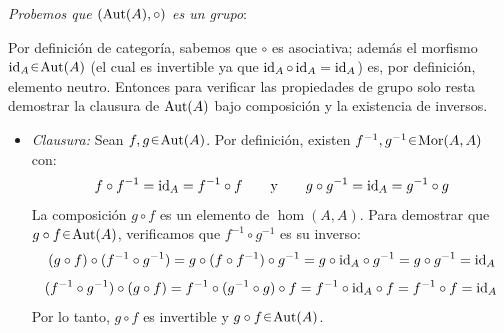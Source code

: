 \begin{sol}
\emph{Probemos que $(\operatorname{Aut}(A), \circ)$ es un grupo}:\par
Por definición de categoría, sabemos que $\circ$ es asociativa; además el morfismo $\id_A\en\aut(A)$ (el cual es invertible ya que $\operatorname{id}_A \circ \operatorname{id}_A = \operatorname{id}_A$) es, por definición, elemento neutro. Entonces para verificar las propiedades de grupo solo resta demostrar la clausura de $\operatorname{Aut}(A)$ bajo composición y la existencia de inversos.
\begin{itemize}
    \item \emph{Clausura:}
    Sean $f, g \en \aut(A)$. Por definición, existen $f^{-1}, g^{-1} \en \hom(A,A)$ con:
    \[
    f \circ f^{-1} = \operatorname{id}_A = f^{-1} \circ f \qquad \text{y} \qquad g \circ g^{-1} = \operatorname{id}_A = g^{-1} \circ g
    \]
    La composición $g \circ f$ es un elemento de $\hom(A,A)$. Para demostrar que $g \circ f \en \aut(A)$, verificamos que $f^{-1} \circ g^{-1}$ es su inverso:
    \[
    (g \circ f) \circ (f^{-1} \circ g^{-1}) = g \circ (f \circ f^{-1}) \circ g^{-1} = g \circ {\operatorname{id}_A} \circ g^{-1} = g \circ g^{-1} = \operatorname{id}_A
    \]
    \[
    (f^{-1} \circ g^{-1}) \circ (g \circ f) = f^{-1} \circ (g^{-1} \circ g) \circ f = f^{-1} \circ {\operatorname{id}_A} \circ f = f^{-1} \circ f = \operatorname{id}_A
    \]
    Por lo tanto, $g \circ f$ es invertible y $g \circ f \en \aut(A)$.


\end{itemize}
\end{sol}
